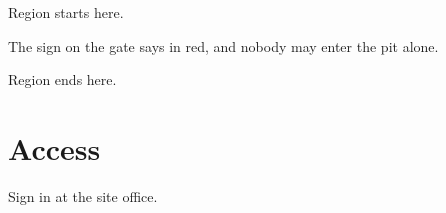 \documentclass[11pt]{article}
\begin{document}
Region starts here.

The sign on the gate says  in red, and nobody may enter the pit alone.

Region ends here.

\section{Access}
Sign in at the site office.
\end{document}
